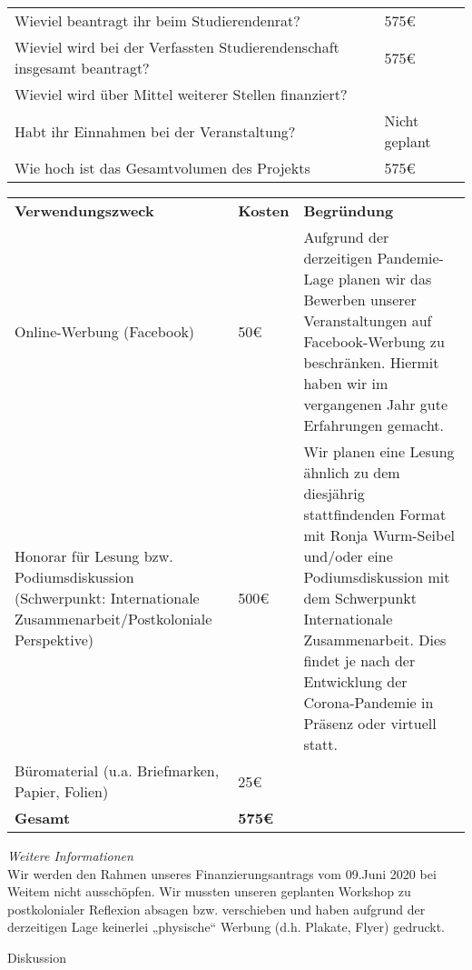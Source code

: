 {\begin{tabular}{l l}
        Wieviel beantragt ihr beim Studierendenrat?                             & 575€                     \\
        Wieviel wird bei der Verfassten Studierendenschaft insgesamt beantragt? & 575€    \\
        Wieviel wird über Mittel weiterer Stellen finanziert?                   &           \\
        Habt ihr Einnahmen bei der Veranstaltung?                               & Nicht geplant                      \\
        Wie hoch ist das Gesamtvolumen des Projekts                             & 575€ \\
    \end{tabular}
    \newline
    \vspace*{2em}
    \newline
    \begin{tabular}{p{4cm} p{2cm} p{9cm}}
        \textbf{Verwendungszweck} & \textbf{Kosten} & \textbf{Begründung} \\
        Online-Werbung (Facebook) & 50€ & Aufgrund der derzeitigen Pandemie-Lage planen wir das Bewerben unserer Veranstaltungen auf Facebook-Werbung zu beschränken. Hiermit haben wir im vergangenen Jahr gute Erfahrungen gemacht. \\
        Honorar für Lesung bzw. Podiumsdiskussion \newline (Schwerpunkt: Internationale Zusammenarbeit/Postkoloniale Perspektive) & 500€ & Wir planen eine Lesung ähnlich zu dem diesjährig stattfindenden Format mit Ronja Wurm-Seibel und/oder eine Podiumsdiskussion mit dem Schwerpunkt Internationale Zusammenarbeit. Dies findet je nach der Entwicklung der Corona-Pandemie in Präsenz oder virtuell statt.\\
        Büromaterial (u.a. Briefmarken, Papier, Folien) & 25€ & \\
        \textbf{Gesamt} & \textbf{575€} & \\      
    \end{tabular}
    \newline
    \emph{Weitere Informationen}\\
    Wir werden den Rahmen unseres Finanzierungsantrags vom 09.Juni 2020 bei Weitem nicht ausschöpfen. Wir mussten unseren geplanten Workshop zu postkolonialer Reflexion absagen bzw. verschieben und haben aufgrund der derzeitigen Lage keinerlei „physische“ Werbung (d.h. Plakate, Flyer) gedruckt.
}{
    Diskussion
}
